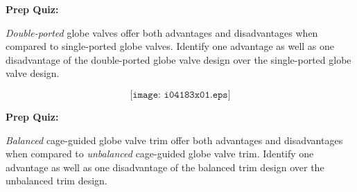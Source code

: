 \vfil \eject

\noindent
{\bf Prep Quiz:}

{\it Double-ported} globe valves offer both advantages and disadvantages when compared to single-ported globe valves.  Identify one advantage as well as one disadvantage of the double-ported globe valve design over the single-ported globe valve design.

$$\texttt{[image: i04183x01.eps]}$$








\vfil \eject

\noindent
{\bf Prep Quiz:}

{\it Balanced} cage-guided globe valve trim offer both advantages and disadvantages when compared to {\it unbalanced} cage-guided globe valve trim.  Identify one advantage as well as one disadvantage of the balanced trim design over the unbalanced trim design.






